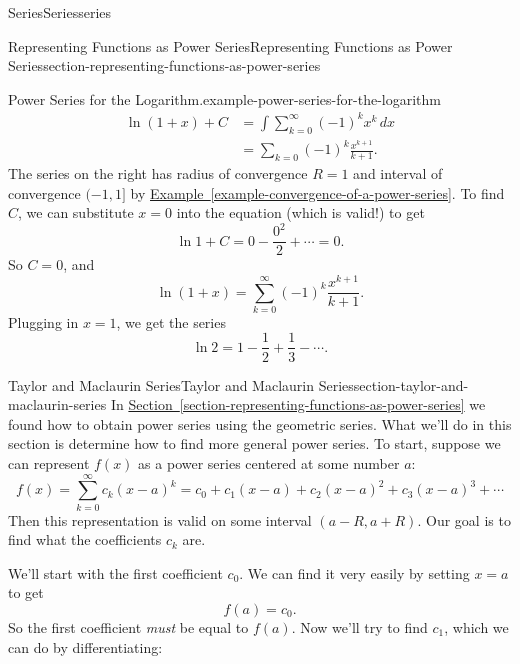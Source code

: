 \documentclass[oneside,10pt,]{book}
\numberwithin{equation}{section}
\newcommand{\amp}{&}
\begin{document}
\begin{chapterptx}{Series}{}{Series}{}{}{series}
\begin{sectionptx}{Representing Functions as Power Series}{}{Representing Functions as Power Series}{}{}{section-representing-functions-as-power-series}
\begin{example}{Power Series for the Logarithm.}{example-power-series-for-the-logarithm}
\begin{align*}
\ln(1 + x) + C \amp = \int\sum_{k=0}^{\infty}(-1)^{k}x^{k}\,dx \\
\amp = \sum_{k=0} (-1)^{k} \frac{x^{k+1}}{k+1}\text{.}
\end{align*}
The series on the right has radius of convergence \(R = 1\) and interval of convergence \((-1, 1]\) by \hyperref[example-convergence-of-a-power-series]{Example~\ref{example-convergence-of-a-power-series}}. To find \(C\), we can substitute \(x = 0\) into the equation (which is valid!) to get%
\begin{equation*}
\ln1 + C = 0 - \frac{0^{2}}{2} + \cdots = 0\text{.}
\end{equation*}
So \(C = 0\), and%
\begin{equation*}
\ln(1 + x) = \sum_{k=0}^{\infty}(-1)^{k}\frac{x^{k+1}}{k+1}\text{.}
\end{equation*}
Plugging in \(x = 1\), we get the series%
\begin{equation*}
\ln2 = 1 - \frac{1}{2} + \frac{1}{3} - \cdots\text{.}
\end{equation*}
%
\end{example}
\end{sectionptx}
%
%
\typeout{************************************************}
\typeout{************************************************}
%
\begin{sectionptx}{Taylor and Maclaurin Series}{}{Taylor and Maclaurin Series}{}{}{section-taylor-and-maclaurin-series}
\hypertarget{p-959}{}%
In \hyperref[section-representing-functions-as-power-series]{Section~\ref{section-representing-functions-as-power-series}} we found how to obtain power series using the geometric series. What we'll do in this section is determine how to find more general power series. To start, suppose we can represent \(f(x)\) as a power series centered at some number \(a\):%
\begin{equation*}
f(x) = \sum_{k=0}^{\infty}c_{k}(x - a)^{k} = c_{0} + c_{1}(x - a) + c_{2}(x - a)^{2} + c_{3}(x - a)^{3} + \cdots
\end{equation*}
Then this representation is valid on some interval \((a - R, a + R)\). Our goal is to find what the coefficients \(c_{k}\) are.%
\par
\hypertarget{p-960}{}%
We'll start with the first coefficient \(c_{0}\). We can find it very easily by setting \(x = a\) to get%
\begin{equation*}
f(a) = c_{0}\text{.}
\end{equation*}
So the first coefficient \emph{must} be equal to \(f(a)\). Now we'll try to find \(c_{1}\), which we can do by differentiating:%

\end{sectionptx}
\end{chapterptx}
\end{document}
